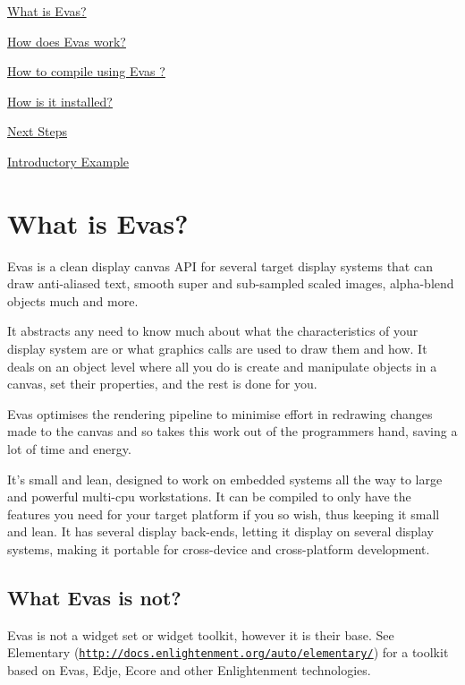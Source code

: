 \begin{DoxyItemize}
\item \hyperlink{index_intro}{What is Evas?} \item \hyperlink{index_work}{How does Evas work?} \item \hyperlink{index_compiling}{How to compile using Evas ?} \item \hyperlink{index_install}{How is it installed?} \item \hyperlink{index_next_steps}{Next Steps} \item \hyperlink{index_intro_example}{Introductory Example}\end{DoxyItemize}
\hypertarget{index_intro}{}\section{What is Evas?}\label{index_intro}
Evas is a clean display canvas API for several target display systems that can draw anti-\/aliased text, smooth super and sub-\/sampled scaled images, alpha-\/blend objects much and more.

It abstracts any need to know much about what the characteristics of your display system are or what graphics calls are used to draw them and how. It deals on an object level where all you do is create and manipulate objects in a canvas, set their properties, and the rest is done for you.

Evas optimises the rendering pipeline to minimise effort in redrawing changes made to the canvas and so takes this work out of the programmers hand, saving a lot of time and energy.

It's small and lean, designed to work on embedded systems all the way to large and powerful multi-\/cpu workstations. It can be compiled to only have the features you need for your target platform if you so wish, thus keeping it small and lean. It has several display back-\/ends, letting it display on several display systems, making it portable for cross-\/device and cross-\/platform development.\hypertarget{index_intro_not_evas}{}\subsection{What Evas is not?}\label{index_intro_not_evas}
Evas is not a widget set or widget toolkit, however it is their base. See Elementary (\href{http://docs.enlightenment.org/auto/elementary/}{\tt http://docs.enlightenment.org/auto/elementary/}) for a toolkit based on Evas, Edje, Ecore and other Enlightenment technologies.

